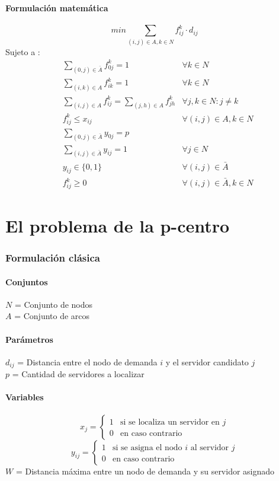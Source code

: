 \documentclass{article}
\numberwithin{equation}{section}
\begin{document}
\subsection{Formulación matemática}
\begin{equation}
min \sum_{(i,j) \in A, k \in N} f_{ij}^k \cdot d_{ij}
\end{equation}
Sujeto a : \begin{align}
& \sum_{(0,j) \in \bar{A}} f_{0j}^k = 1 &\forall k \in N \\
& \sum_{(i,k) \in A} f_{ik}^k = 1 &\forall k \in N \\
& \sum_{(i,j) \in A} f_{ij}^k = \sum_{(j,h) \in A} f_{jh}^k &\forall j,k \in N : j \neq k \\
& f_{ij}^k \leq x_{ij} &\forall (i,j) \in A, k \in N \\
& \sum_{(0,j) \in \bar{A}} y_{0j} = p \\
& \sum_{(i,j) \in \bar{A}} y_{ij} = 1 &\forall j \in N \\
& y_{ij} \in \{0,1\} &\forall (i,j) \in \bar{A}\\
& f_{ij}^k \geq 0 &\forall (i,j) \in \bar{A}, k \in N
\end{align}

\newpage
\part{El problema de la p-centro}
\section{Formulación clásica}
\subsection{Conjuntos}
$N$ = Conjunto de nodos\\
$A$ = Conjunto de arcos
\subsection{Parámetros}
$d_{ij}$ = Distancia entre el nodo de demanda $i$ y el servidor candidato $j$\\
$p$ = Cantidad de servidores a localizar
\subsection{Variables}
\begin{center}
\[x_{j}={\begin{cases}1&{\mbox{si se localiza un servidor en $j$}}\\0&{\mbox{en caso contrario}}\end{cases}}
\]
\[y_{ij}={\begin{cases}1&{\mbox{si se asigna el nodo $i$ al servidor $j$}}\\0&{\mbox{en caso contrario}}\end{cases}}
\]
$W$ = Distancia máxima entre un nodo de demanda y su servidor asignado
\end{center}
\end{document}
